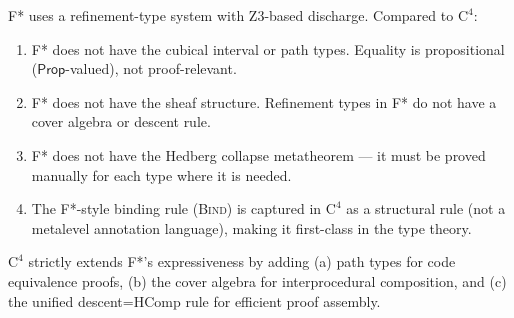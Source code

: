 F* uses a refinement-type system with Z3-based discharge.  Compared
to $\mathrm{C}^4$:
\begin{enumerate}
\item F* does not have the cubical interval or path types.  Equality
  is propositional (\(\mathsf{Prop}\)-valued), not proof-relevant.
\item F* does not have the sheaf structure.  Refinement types in F*
  do not have a cover algebra or descent rule.
\item F* does not have the Hedberg collapse metatheorem --- it must
  be proved manually for each type where it is needed.
\item The F*-style binding rule (\textsc{Bind}) is captured in $\mathrm{C}^4$
  as a structural rule (not a metalevel annotation language), making it
  first-class in the type theory.
\end{enumerate}
$\mathrm{C}^4$ strictly extends F*'s expressiveness by adding (a) path
types for code equivalence proofs, (b) the cover algebra for
interprocedural composition, and (c) the unified descent=HComp rule
for efficient proof assembly.
